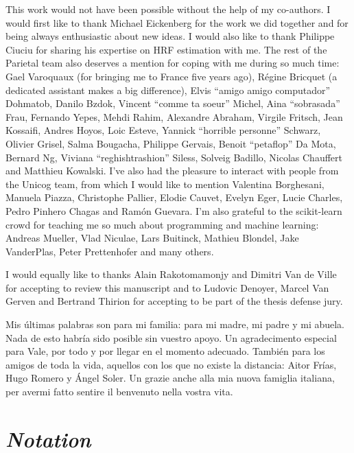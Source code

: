 \documentclass[nobib, a4paper, notoc, twoside, justified]{tufte-book}
\begin{document}
This work would not have been possible without the help of my co-authors. I would first like to thank Michael Eickenberg for the work we did together and for being always enthusiastic about new ideas. I would also like to thank Philippe Ciuciu for sharing his expertise on HRF estimation with me. The rest of the Parietal team also deserves a mention for coping with me during so much time: Gael Varoquaux (for bringing me to France five years ago), Régine Bricquet (a dedicated assistant makes a big difference), Elvis ``amigo amigo computador'' Dohmatob, Danilo Bzdok, Vincent ``comme ta soeur'' Michel, Aina ``sobrasada'' Frau, Fernando Yepes, Mehdi Rahim, Alexandre Abraham, Virgile Fritsch, Jean Kossaifi, Andres Hoyos, Loic Esteve, Yannick ``horrible personne'' Schwarz, Olivier Grisel, Salma Bougacha, Philippe Gervais, Benoit ``petaflop'' Da Mota, Bernard Ng, Viviana ``reghishtrashion'' Siless, Solveig Badillo,  Nicolas Chauffert and Matthieu Kowalski. I've also had the pleasure to interact with people from the Unicog team, from which I would like to mention Valentina Borghesani, Manuela Piazza, Christophe Pallier, Elodie Cauvet, Evelyn Eger, Lucie Charles, Pedro Pinhero Chagas and Ramón Guevara. I'm also grateful to the scikit-learn crowd for teaching me so much about programming and machine learning: Andreas Mueller, Vlad Niculae, Lars Buitinck, Mathieu Blondel, Jake VanderPlas, Peter Prettenhofer and many others.

I would equally like to thanks Alain Rakotomamonjy and Dimitri Van de Ville for accepting to review this manuscript and to Ludovic Denoyer, Marcel Van Gerven and Bertrand Thirion for accepting to be part of the thesis defense jury.

Mis últimas palabras son para mi familia: para mi madre, mi padre y mi abuela. Nada de esto habría sido posible sin vuestro apoyo.  Un agradecimento especial para Vale, por todo y por llegar en el momento adecuado. También para los amigos de toda la vida, aquellos con los que no existe la distancia: Aitor Frías, Hugo Romero y Ángel Soler. Un grazie anche alla mia nuova famiglia italiana, per avermi fatto sentire il benvenuto nella vostra vita.

\vspace*{\fill}

\clearpage

\newpage\null\newpage


\vspace*{\fill}

{\section*{\Huge \it Notation}}
\end{document}
